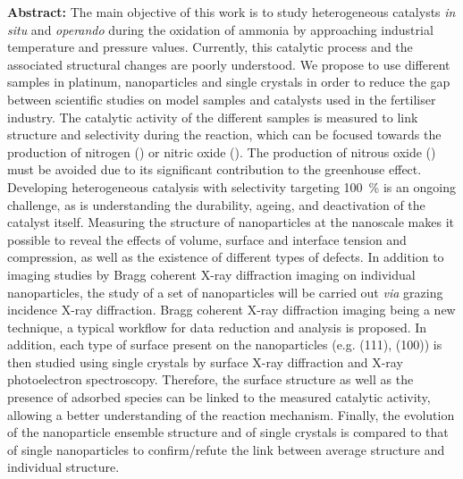 \begin{mdframed}[linecolor=Prune,linewidth=1]
\begin{multicols}{2}
\noindent \textbf{Abstract:}
The main objective of this work is to study heterogeneous catalysts \textit{in situ} and \textit{operando} during the oxidation of ammonia by approaching industrial temperature and pressure values.
Currently, this catalytic process and the associated structural changes are poorly understood.
We propose to use different samples in platinum, nanoparticles and single crystals in order to reduce the gap between scientific studies on model samples and catalysts used in the fertiliser industry.
The catalytic activity of the different samples is measured to link structure and selectivity during the reaction, which can be focused towards the production of nitrogen () or nitric oxide ().
The production of nitrous oxide () must be avoided due to its significant contribution to the greenhouse effect.
Developing heterogeneous catalysis with selectivity targeting \qty{100}{\percent} is an ongoing challenge, as is understanding the durability, ageing, and deactivation of the catalyst itself.
Measuring the structure of nanoparticles at the nanoscale makes it possible to reveal the effects of volume, surface and interface tension and compression, as well as the existence of different types of defects.
In addition to imaging studies by Bragg coherent X-ray diffraction imaging on individual nanoparticles, the study of a set of nanoparticles will be carried out \textit{via} grazing incidence X-ray diffraction.
Bragg coherent X-ray diffraction imaging being a new technique, a typical workflow for data reduction and analysis is proposed.
In addition, each type of surface present on the nanoparticles (e.g. (111), (100)) is then studied using single crystals by surface X-ray diffraction and X-ray photoelectron spectroscopy.
Therefore, the surface structure as well as the presence of adsorbed species can be linked to the measured catalytic activity, allowing a better understanding of the reaction mechanism.
Finally, the evolution of the nanoparticle ensemble structure and of single crystals is compared to that of single nanoparticles to confirm/refute the link between average structure and individual structure.
\end{multicols}
\end{mdframed}

\normalsize

\vspace{\fill} %

\newpage\thispagestyle{empty}\null\newpage